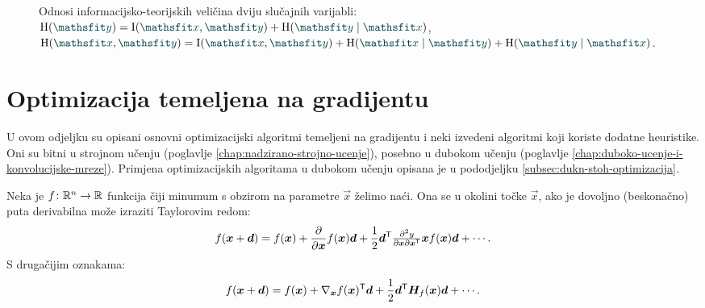 \documentclass[utf8, diplomski, lmodern]{fer}
\begin{document}
\begin{figure}
\centering
{}
\caption{Odnosi informacijsko-teorijskih veličina dviju slučajnih varijabli: $\H(\rvar y)=\I(\rvar x,\rvar y)+\H(\rvar y\mid\rvar x)$,  $\H(\rvar x,\rvar y)=\I(\rvar x,\rvar y)+\H(\rvar x\mid\rvar y)+\H(\rvar y\mid\rvar x)$.}
\label{fig:entropije}
\end{figure}


\section{Optimizacija temeljena na gradijentu}

U ovom odjeljku su opisani osnovni optimizacijski algoritmi temeljeni na gradijentu i neki izvedeni algoritmi koji koriste dodatne heuristike. Oni su bitni u strojnom učenju (poglavlje \ref{chap:nadzirano-strojno-ucenje}), posebno u dubokom učenju (poglavlje \ref{chap:duboko-ucenje-i-konvolucijske-mreze}). Primjena optimizacijskih algoritama u dubokom učenju opisana je u pododjeljku \ref{subsec:dukn-stoh-optimizacija}.

Neka je $f \colon \mathbb{R}^n \to \mathbb{R}$ funkcija čiji minumum s obzirom na parametre $\vec x$ želimo naći. Ona se u okolini točke $\vec x$, ako je dovoljno (beskonačno) puta derivabilna može izraziti Taylorovim redom:
\begin{align}
f(\vec x+\vec d) = f(\vec x) + \pd{}{\vec x}f(\vec x)\vec d + \frac{1}{2}\vec d^\tp{\tfrac{\partial^2y}{\partial\vec x\partial\vec x^\tp}}{\vec x}f(\vec x)\vec d + \cdots \text{.}
\end{align}
S drugačijim oznakama:
\begin{align} \label{eq:taylorov-red}
f(\vec x+\vec d) = f(\vec x) + \nabla_{\vec x}f(\vec x)^\tp\vec d + \frac{1}{2}\vec d^\tp\vec H_f(\vec x)\vec d + \cdots \text{.}
\end{align}
\end{document}
